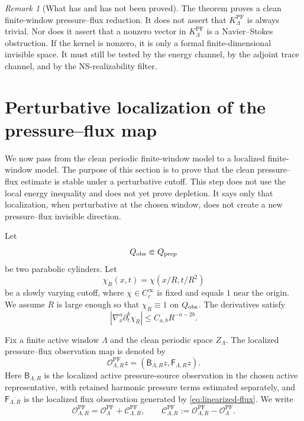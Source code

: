 \documentclass[11pt]{article}
\numberwithin{equation}{section}
\theoremstyle{plain}
\theoremstyle{definition}
\theoremstyle{remark}
\newtheorem{remark}[theorem]{Remark}
\newcommand{\PF}{\mathrm{PF}}
\newcommand{\calC}{\mathcal C}
\newcommand{\calO}{\mathcal O}
\newcommand{\Bop}{\mathsf B}
\newcommand{\Fop}{\mathsf F}
\begin{document}
\begin{remark}[What has and has not been proved]
The theorem proves a clean finite-window pressure--flux reduction.  It does not assert that \(K^{\PF}_\Lambda\) is always trivial.  Nor does it assert that a nonzero vector in \(K^{\PF}_\Lambda\) is a Navier--Stokes obstruction.  If the kernel is nonzero, it is only a formal finite-dimensional invisible space.  It must still be tested by the energy channel, by the adjoint trace channel, and by the NS-realizability filter.
\end{remark}

\section{Perturbative localization of the pressure--flux map}
\label{sec:perturbative-localization}

We now pass from the clean periodic finite-window model to a localized finite-window model.  The purpose of this section is to prove that the clean pressure--flux estimate is stable under a perturbative cutoff.  This step does not use the local energy inequality and does not yet prove depletion.  It says only that localization, when perturbative at the chosen window, does not create a new pressure--flux invisible direction.

Let
\[
        Q_{\rm obs}\Subset Q_{\rm prep}
\]
be two parabolic cylinders.  Let
\[
        \chi_R(x,t)=\chi(x/R,t/R^2)
\]
be a slowly varying cutoff, where \(\chi\in C_c^\infty\) is fixed and equals \(1\) near the origin.  We assume \(R\) is large enough so that \(\chi_R\equiv1\) on \(Q_{\rm obs}\).  The derivatives satisfy
\begin{equation}
        |\nabla_x^a\partial_t^b\chi_R|
        \le
        C_{a,b}R^{-a-2b}.
        \label{eq:cutoff-derivative-bound}
\end{equation}

Fix a finite active window \(\Lambda\) and the clean periodic space \(Z_\Lambda\).  The localized pressure--flux observation map is denoted by
\[
        \calO^{\PF}_{\Lambda,R}z=(\Bop_{\Lambda,R}z,\Fop_{\Lambda,R}z).
\]
Here \(\Bop_{\Lambda,R}\) is the localized active pressure-source observation in the chosen active representative, with retained harmonic pressure terms estimated separately, and \(\Fop_{\Lambda,R}\) is the localized flux observation generated by \eqref{eq:linearized-flux}.  We write
\begin{equation}
        \calO^{\PF}_{\Lambda,R}
        =
        \calO^{\PF}_\Lambda+\calC^{\PF}_{\Lambda,R},
        \qquad
        \calC^{\PF}_{\Lambda,R}:=\calO^{\PF}_{\Lambda,R}-\calO^{\PF}_\Lambda.
        \label{eq:localization-commutator}
\end{equation}
\end{document}
